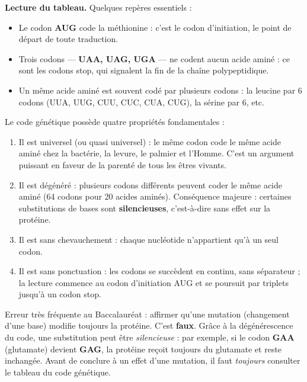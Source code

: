 \documentclass[11pt]{article}
\newcommand{\cle}[1]{{\popxbold\color{popdark}#1}}
\begin{document}
\textbf{Lecture du tableau.} Quelques repères essentiels :
\begin{itemize}
\item Le codon \textbf{AUG} code la méthionine : c'est le \cle{codon d'initiation}, le point de départ de toute traduction.
\item Trois codons — \textbf{UAA, UAG, UGA} — ne codent aucun acide aminé : ce sont les \cle{codons stop}, qui signalent la fin de la chaîne polypeptidique.
\item Un même acide aminé est souvent codé par plusieurs codons : la leucine par 6 codons (UUA, UUG, CUU, CUC, CUA, CUG), la sérine par 6, etc.
\end{itemize}

\begin{propriete}
Le code génétique possède quatre propriétés fondamentales :
\begin{enumerate}
\item Il est \cle{universel} (ou quasi universel) : le même codon code le même acide aminé chez la bactérie, la levure, le palmier et l'Homme. C'est un argument puissant en faveur de la parenté de tous les êtres vivants.
\item Il est \cle{dégénéré} : plusieurs codons différents peuvent coder le même acide aminé (64 codons pour 20 acides aminés). Conséquence majeure : certaines substitutions de bases sont \textbf{silencieuses}, c'est-à-dire sans effet sur la protéine.
\item Il est \cle{sans chevauchement} : chaque nucléotide n'appartient qu'à un seul codon.
\item Il est \cle{sans ponctuation} : les codons se succèdent en continu, sans séparateur ; la lecture commence au codon d'initiation AUG et se poursuit par triplets jusqu'à un codon stop.
\end{enumerate}
\end{propriete}

\begin{attention}
Erreur très fréquente au Baccalauréat : affirmer qu'une mutation (changement d'une base) modifie toujours la protéine. C'est \textbf{faux}. Grâce à la dégénérescence du code, une substitution peut être \emph{silencieuse} : par exemple, si le codon \textbf{GAA} (glutamate) devient \textbf{GAG}, la protéine reçoit toujours du glutamate et reste inchangée. Avant de conclure à un effet d'une mutation, il faut \emph{toujours} consulter le tableau du code génétique.
\end{attention}
\end{document}
